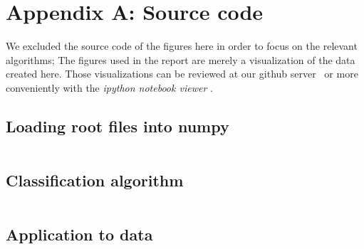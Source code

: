 \section{Appendix A: Source code}
We excluded the source code of the figures here in order to focus on the relevant algorithms; 
The figures used in the report are merely a visualization of the data created here. Those visualizations
can be reviewed at our github server~\cite{FPII_Z0} or more conveniently with the \textit{ipython notebook viewer} 
\cite{notebook_viewer}.
\subsection{Loading root files into numpy}
\label{sub:loading_root_into_numpy}
\inputminted{python}{analysis/IO.py}    
\subsection{Classification algorithm}
\label{sub:cut.py}
\inputminted{python}{analysis/cut.py}    
\subsection{Application to data}
\label{sub:application_to_data}
\inputminted{python}{analysis/data_all_gev.py}    
